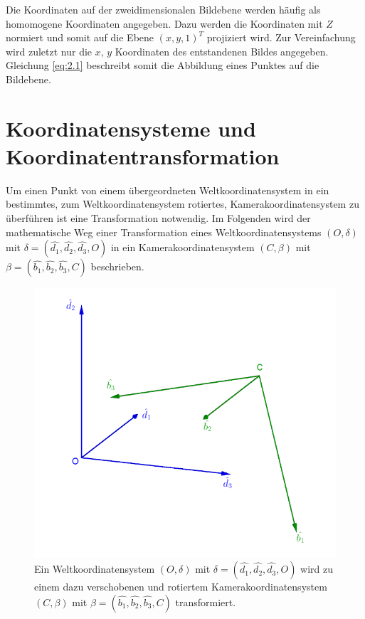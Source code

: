 Die Koordinaten auf der zweidimensionalen Bildebene werden häufig als homomogene Koordinaten angegeben. Dazu werden die Koordinaten mit $Z$ normiert und somit auf die Ebene $(x,y,1)^T$ projiziert wird. Zur Vereinfachung wird zuletzt nur die $x,\,y$ Koordinaten des entstandenen Bildes angegeben. Gleichung \ref{eq:2.1} beschreibt somit die Abbildung eines Punktes auf die Bildebene.

\section{Koordinatensysteme und Koordinatentransformation}

Um einen Punkt von einem übergeordneten Weltkoordinatensystem in ein bestimmtes, zum Weltkoordinatensystem rotiertes, Kamerakoordinatensystem zu überführen ist eine Transformation notwendig. Im Folgenden wird der mathematische Weg einer Transformation eines Weltkoordinatensystems $(O,\delta)$ mit $\delta = (\hat{d_1},\hat{d_2},\hat{d_3},O)$ in ein Kamerakoordinatensystem $(C,\beta)$ mit $\beta = (\hat{b_1},\hat{b_2},\hat{b_3},C)$ beschrieben.



\begin{figure}[!htb]
	\centering
	\includegraphics[width=0.7\linewidth]{images/WeltKordSys.png}
	\caption[Koordinatentransformation]{Ein Weltkoordinatensystem $(O,\delta)$ mit $\delta = (\hat{d_1},\hat{d_2},\hat{d_3},O)$ wird zu einem dazu verschobenen und rotiertem Kamerakoordinatensystem  $(C,\beta)$ mit $\beta = (\hat{b_1},\hat{b_2},\hat{b_3},C)$ transformiert.}
	\label{fig:Koordinatensysteme1}
\end{figure}

